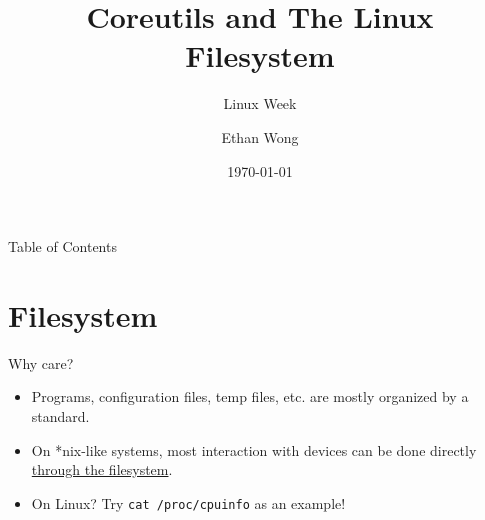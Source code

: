 \documentclass{beamer}
\title{Coreutils and The Linux Filesystem}
\subtitle{Linux Week \the\year{}}
\author{Ethan Wong}
\date{\today}
\institute{Linux Users Group @ UIC}
\begin{document}
\begin{frame}
	\titlepage
\end{frame}

\begin{frame}{Table of Contents}
	\tableofcontents[pausesections]
\end{frame}

\section{Filesystem}
\begin{frame}{Why care?}
	\begin{itemize}
		\item Programs, configuration files, temp files, etc. are mostly
			organized by a standard.
			\pause

		\item On *nix-like systems, most interaction with devices can be done
			directly \underline{through the filesystem}.
			\pause

		\item On Linux? Try \texttt{cat /proc/cpuinfo} as an example!
	\end{itemize}
\end{frame}
\end{document}

